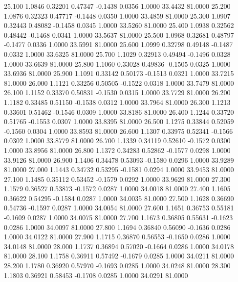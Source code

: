   25.100   1.0846   0.32201   0.47347  -0.1438   0.0356   1.0000  33.4432  81.0000
  25.200   1.0876   0.32323   0.47717  -0.1448   0.0350   1.0000  33.4859  81.0000
  25.300   1.0907   0.32443   0.48082  -0.1458   0.0345   1.0000  33.5260  81.0000
  25.400   1.0938   0.32562   0.48442  -0.1468   0.0341   1.0000  33.5637  81.0000
  25.500   1.0968   0.32681   0.48797  -0.1477   0.0336   1.0000  33.5991  81.0000
  25.600   1.0999   0.32798   0.49148  -0.1487   0.0332   1.0000  33.6325  81.0000
  25.700   1.1029   0.32913   0.49494  -0.1496   0.0328   1.0000  33.6639  81.0000
  25.800   1.1060   0.33028   0.49836  -0.1505   0.0325   1.0000  33.6936  81.0000
  25.900   1.1091   0.33142   0.50173  -0.1513   0.0321   1.0000  33.7215  81.0000
  26.000   1.1121   0.33256   0.50505  -0.1522   0.0318   1.0000  33.7479  81.0000
  26.100   1.1152   0.33370   0.50831  -0.1530   0.0315   1.0000  33.7729  81.0000
  26.200   1.1182   0.33485   0.51150  -0.1538   0.0312   1.0000  33.7964  81.0000
  26.300   1.1213   0.33601   0.51462  -0.1546   0.0309   1.0000  33.8186  81.0000
  26.400   1.1244   0.33720   0.51765  -0.1553   0.0307   1.0000  33.8395  81.0000
  26.500   1.1275   0.33844   0.52059  -0.1560   0.0304   1.0000  33.8593  81.0000
  26.600   1.1307   0.33975   0.52341  -0.1566   0.0302   1.0000  33.8779  81.0000
  26.700   1.1339   0.34119   0.52610  -0.1572   0.0300   1.0000  33.8956  81.0000
  26.800   1.1372   0.34283   0.52862  -0.1577   0.0298   1.0000  33.9126  81.0000
  26.900   1.1406   0.34478   0.53093  -0.1580   0.0296   1.0000  33.9289  81.0000
  27.000   1.1443   0.34732   0.53295  -0.1581   0.0294   1.0000  33.9453  81.0000
  27.100   1.1485   0.35112   0.53452  -0.1579   0.0292   1.0000  33.9629  81.0000
  27.300   1.1579   0.36527   0.53873  -0.1572   0.0287   1.0000  34.0018  81.0000
  27.400   1.1605   0.36622   0.54295  -0.1584   0.0287   1.0000  34.0035  81.0000
  27.500   1.1628   0.36690   0.54736  -0.1597   0.0287   1.0000  34.0054  81.0000
  27.600   1.1651   0.36753   0.55181  -0.1609   0.0287   1.0000  34.0075  81.0000
  27.700   1.1673   0.36805   0.55631  -0.1623   0.0286   1.0000  34.0097  81.0000
  27.800   1.1694   0.36840   0.56090  -0.1636   0.0286   1.0000  34.0122  81.0000
  27.900   1.1715   0.36870   0.56553  -0.1650   0.0286   1.0000  34.0148  81.0000
  28.000   1.1737   0.36894   0.57020  -0.1664   0.0286   1.0000  34.0178  81.0000
  28.100   1.1758   0.36911   0.57492  -0.1679   0.0285   1.0000  34.0211  81.0000
  28.200   1.1780   0.36920   0.57970  -0.1693   0.0285   1.0000  34.0248  81.0000
  28.300   1.1803   0.36921   0.58453  -0.1708   0.0285   1.0000  34.0291  81.0000
